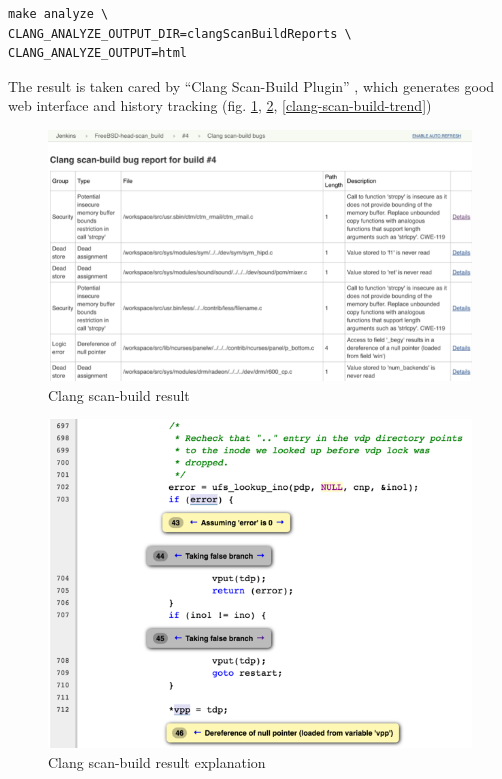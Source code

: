 \documentclass[a4paper,twocolumn,10pt]{article}
\begin{document}
\begin{lstlisting}[caption=Command to perform clang scan-build,label=make-analyze]
make analyze \
CLANG_ANALYZE_OUTPUT_DIR=clangScanBuildReports \
CLANG_ANALYZE_OUTPUT=html
\end{lstlisting}

The result is taken cared by ``Clang Scan-Build Plugin''
\cite{jenkins-clang-scan-build-plugin}, which generates good web interface and
history tracking (fig. \ref{scan-build-result}, \ref{scan-build-path},
\ref{clang-scan-build-trend})

\begin{figure}
\includegraphics[width=\textwidth]{scan-build-result.png}
\caption{Clang scan-build result}
\label{scan-build-result}
\end{figure}

\begin{figure}
\includegraphics[width=\textwidth]{scan-build-path.png}
\caption{Clang scan-build result explanation}
\label{scan-build-path}
\end{figure}
\end{document}

